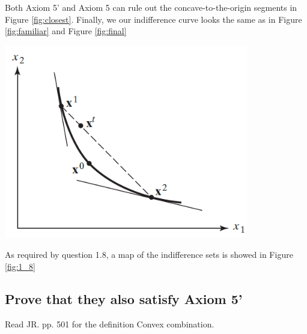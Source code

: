 \documentclass{article}
\begin{document}
\begin{mdframed}[backgroundcolor=blue!20,linecolor=white]
Both Axiom 5' and Axiom 5 can rule out the concave-to-the-origin segments in Figure \ref{fig:closest}.
Finally, we our indifference curve looks the same as in Figure \ref{fig:familiar} and Figure \ref{fig:final}

\vspace{2mm}

{\centering
\includegraphics[width=0.8\textwidth]{1.final}
\label{fig:final}}

\end{mdframed}

As required by question 1.8, a map of the indifference sets is showed in Figure \ref{fig:1_8}

{\centering
{}
\label{fig:1_8}}

\subsection{Prove that they also satisfy Axiom 5'}

\begin{mdframed}[backgroundcolor=blue!20,linecolor=white] 
Read JR. pp. 501 for the definition Convex combination.
\end{mdframed}
\end{document}
